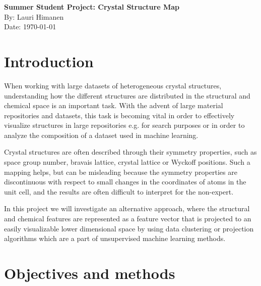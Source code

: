 \documentclass[12pt,a4paper,oneside]{article}	%
\newcommand{\+}[1]{\ensuremath{\mathbf{#1}}}		%
\begin{document}
\begin{flushleft}
\Large\textbf{Summer Student Project: Crystal Structure Map}\\
\vspace{0.2cm}
\large By: Lauri Himanen\\
\large Date: \today\\
\end{flushleft}

\section*{Introduction}
When working with large datasets of heterogeneous crystal structures, understanding how the different structures are distributed in the structural and chemical space is an important task. With the advent of large material repositories and datasets, this task is becoming vital in order to effectively visualize structures in large repositories e.g. for search purposes or in order to analyze the composition of a dataset used in machine learning.

Crystal structures are often described through their symmetry properties, such as space group number, bravais lattice, crystal lattice or Wyckoff positions. Such a mapping helps, but can be misleading because the symmetry properties are discontinuous with respect to small changes in the coordinates of atoms in the unit cell, and the results are often difficult to interpret for the non-expert.

In this project we will investigate an alternative approach, where the structural and chemical features are represented as a feature vector that is projected to an easily visualizable lower dimensional space by using data clustering or projection algorithms which are a part of unsupervised machine learning methods.

\section*{Objectives and methods}
\end{document}
